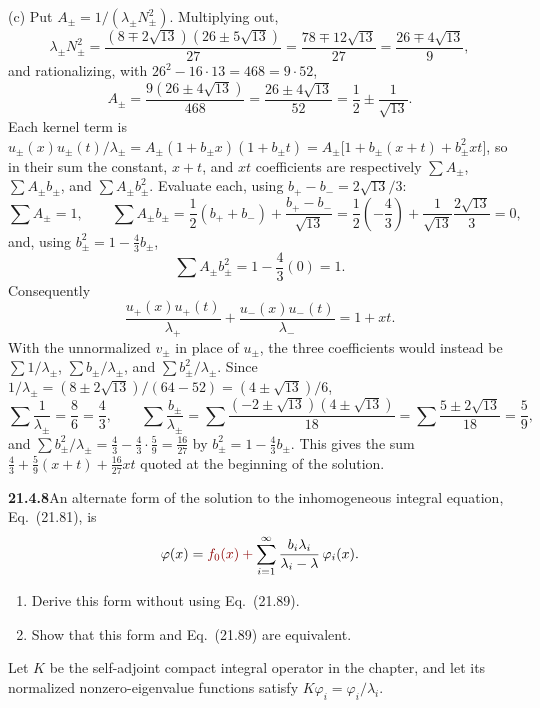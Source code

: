 (c) Put $A_\pm=1/(\lambda_\pm N_\pm^2)$. Multiplying out,
\[
\lambda_\pm N_\pm^2
=\frac{(8\mp2\sqrt{13})(26\pm5\sqrt{13})}{27}
=\frac{78\mp12\sqrt{13}}{27}
=\frac{26\mp4\sqrt{13}}{9},
\]
and rationalizing, with $26^2-16\cdot13=468=9\cdot52$,
\[
A_\pm=\frac{9(26\pm4\sqrt{13})}{468}
=\frac{26\pm4\sqrt{13}}{52}
=\frac12\pm\frac1{\sqrt{13}}.
\]
Each kernel term is
$u_\pm(x)u_\pm(t)/\lambda_\pm
=A_\pm(1+b_\pm x)(1+b_\pm t)
=A_\pm\bigl[1+b_\pm(x+t)+b_\pm^2xt\bigr]$,
so in their sum the constant, $x+t$, and $xt$
coefficients are respectively
$\sum A_\pm$, $\sum A_\pm b_\pm$, and
$\sum A_\pm b_\pm^2$. Evaluate each, using
$b_+-b_-=2\sqrt{13}/3$:
\[
\sum A_\pm=1,\qquad
\sum A_\pm b_\pm
=\frac12(b_++b_-)+\frac{b_+-b_-}{\sqrt{13}}
=\frac12\left(-\frac43\right)
+\frac1{\sqrt{13}}\frac{2\sqrt{13}}3=0,
\]
and, using $b_\pm^2=1-\tfrac43b_\pm$,
\[
\sum A_\pm b_\pm^2=1-\frac43(0)=1.
\]
Consequently
\[
\boxed{\frac{u_+(x)u_+(t)}{\lambda_+}
+\frac{u_-(x)u_-(t)}{\lambda_-}
=1+xt}.
\]
With the unnormalized $v_\pm$ in place of $u_\pm$, the three
coefficients would instead be $\sum1/\lambda_\pm$,
$\sum b_\pm/\lambda_\pm$, and $\sum b_\pm^2/\lambda_\pm$. Since
$1/\lambda_\pm=(8\pm2\sqrt{13})/(64-52)=(4\pm\sqrt{13})/6$,
\[
\sum\frac1{\lambda_\pm}=\frac86=\frac43,\qquad
\sum\frac{b_\pm}{\lambda_\pm}
=\sum\frac{(-2\pm\sqrt{13})(4\pm\sqrt{13})}{18}
=\sum\frac{5\pm2\sqrt{13}}{18}=\frac59,
\]
and $\sum b_\pm^2/\lambda_\pm=\frac43-\frac43\cdot\frac59=\frac{16}{27}$
by $b_\pm^2=1-\frac43b_\pm$. This gives the sum
$\frac43+\frac59(x+t)+\frac{16}{27}xt$ quoted at the beginning of the
solution.


\par\bigskip
\noindent\textbf{21.4.8}\quad An alternate form of the solution to
the inhomogeneous integral equation, Eq.~(21.81), is
\[
\varphi(x)=\erratum{f_0(x)}\mathbin{\erratum{+}}\sum_{i=1}^{\infty}\frac{b_{i}\lambda_{i}}
{\lambda_{i}-\lambda}\,\varphi_{i}(x).
\]
\begin{enumerate}
\item[(a)] Derive this form without using Eq.~(21.89).
\item[(b)] Show that this form and Eq.~(21.89) are equivalent.
\end{enumerate}
\solution
Let $K$ be the self-adjoint compact integral operator in the
chapter, and let its normalized nonzero-eigenvalue functions satisfy
$K\varphi_i=\varphi_i/\lambda_i$.

